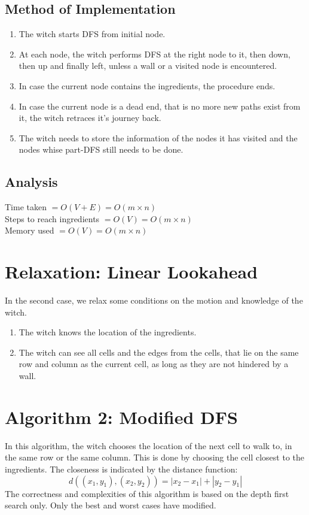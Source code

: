 \documentclass{article} %
\begin{document}
\subsection{Method of Implementation}
\begin{enumerate}
    \item The witch starts DFS from initial node.
    \item At each node, the witch performs DFS at the right node to it, then down, then up and finally left, unless a wall or a visited node is encountered.
    \item In case the current node contains the ingredients, the procedure ends.
    \item In case the current node is a dead end, that is no more new paths exist from it, the witch retraces it's journey back.
    \item The witch needs to store the information of the nodes it has visited and the nodes whise part-DFS still needs to be done.
\end{enumerate}
\subsection{Analysis}
Time taken $= O(V+E) = O(m \times n)$
\\Steps to reach ingredients $= O(V) = O(m \times n)$
\\Memory used $= O(V) = O(m \times n)$

\section{Relaxation: Linear Lookahead}
In the second case, we relax some conditions on the motion and knowledge of the witch.
\begin{enumerate}
    \item The witch knows the location of the ingredients.
    \item The witch can see all cells and the edges from the cells, that lie on the same row and column as the current cell, as long as they are not hindered by a wall.
\end{enumerate}

\section{Algorithm 2: Modified DFS}
In this algorithm, the witch chooses the location of the next cell to walk to, in the same row or the same column. This is done by choosing the cell closest to the ingredients. The closeness is indicated by the distance function:
\[d((x_1,y_1),(x_2,y_2)) = |x_2 - x_1| + |y_2 - y_1|\]
The correctness and complexities of this algorithm is based on the depth first search only. Only the best and worst cases have modified.
\end{document}
